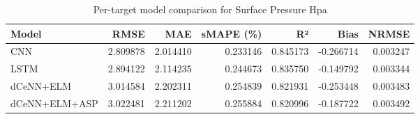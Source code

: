 \begin{table}
\caption{Per-target model comparison for Surface Pressure Hpa}
\begin{tabular}{lrrrrrr}
\toprule
Model & RMSE & MAE & sMAPE (\%) & R² & Bias & NRMSE \\
\midrule
CNN & 2.809878 & 2.014410 & 0.233146 & 0.845173 & -0.266714 & 0.003247 \\
LSTM & 2.894122 & 2.114235 & 0.244673 & 0.835750 & -0.149792 & 0.003344 \\
dCeNN+ELM & 3.014584 & 2.202311 & 0.254839 & 0.821931 & -0.253448 & 0.003483 \\
dCeNN+ELM+ASP & 3.022481 & 2.211202 & 0.255884 & 0.820996 & -0.187722 & 0.003492 \\
\bottomrule
\end{tabular}
\end{table}
